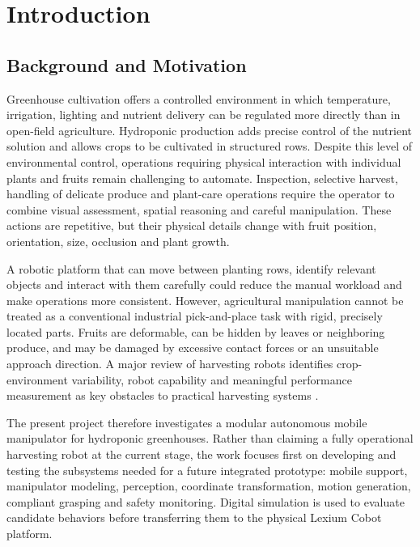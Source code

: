 \chapter{Introduction}
\label{ch:introduction}

\section{Background and Motivation}
\label{sec:background}

Greenhouse cultivation offers a controlled environment in which temperature, irrigation,
lighting and nutrient delivery can be regulated more directly than in open-field
agriculture. Hydroponic production adds precise control of the nutrient solution and
allows crops to be cultivated in structured rows. Despite this level of environmental
control, operations requiring physical interaction with individual plants and fruits
remain challenging to automate. Inspection, selective harvest, handling of delicate
produce and plant-care operations require the operator to combine visual assessment,
spatial reasoning and careful manipulation. These actions are repetitive, but their
physical details change with fruit position, orientation, size, occlusion and plant
growth.

A robotic platform that can move between planting rows, identify relevant objects and
interact with them carefully could reduce the manual workload and make operations more
consistent. However, agricultural manipulation cannot be treated as a conventional
industrial pick-and-place task with rigid, precisely located parts. Fruits are deformable,
can be hidden by leaves or neighboring produce, and may be damaged by excessive contact
forces or an unsuitable approach direction. A major review of harvesting robots
identifies crop-environment variability, robot capability and meaningful performance
measurement as key obstacles to practical harvesting systems \cite{bac2014}.

The present project therefore investigates a modular autonomous mobile manipulator for
hydroponic greenhouses. Rather than claiming a fully operational harvesting robot at the
current stage, the work focuses first on developing and testing the subsystems needed for
a future integrated prototype: mobile support, manipulator modeling, perception,
coordinate transformation, motion generation, compliant grasping and safety monitoring.
Digital simulation is used to evaluate candidate behaviors before transferring them to
the physical Lexium Cobot platform.

